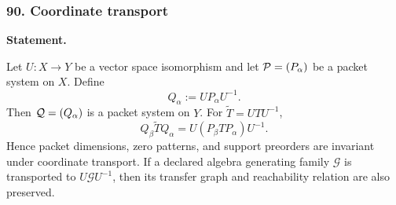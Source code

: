 \subsubsection*{90. Coordinate transport}
\label{rec:PSC-I-T-COORDINATE-TRANSPORT}
\textbf{Statement.}\par
Let $U:X\to Y$ be a vector space isomorphism and let $\mathcal P=(P_\alpha)$ be a packet system on $X$.  Define
\[
Q_\alpha:=UP_\alpha U^{-1}.
\]
Then $\mathcal Q=(Q_\alpha)$ is a packet system on $Y$.  For $\widetilde T=UTU^{-1}$,
\[
\boxed{
Q_\beta\widetilde TQ_\alpha
=
U(P_\beta TP_\alpha)U^{-1}.
}
\]
Hence packet dimensions, zero patterns, and support preorders are invariant under coordinate transport.  If a declared algebra generating family $\mathcal G$ is transported to $U\mathcal G U^{-1}$, then its transfer graph and reachability relation are also preserved.

